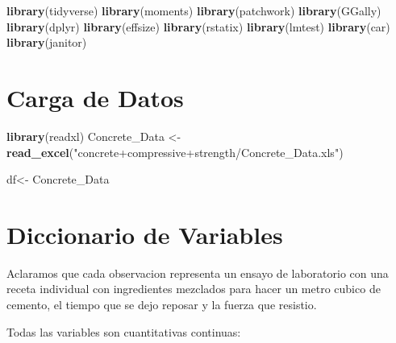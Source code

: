 \documentclass[
]{book}
\newenvironment{Shaded}{\begin{snugshade}}{\end{snugshade}}
\newcommand{\FunctionTok}[1]{\textcolor[rgb]{0.13,0.29,0.53}{\textbf{#1}}}
\newcommand{\NormalTok}[1]{#1}
\newcommand{\OtherTok}[1]{\textcolor[rgb]{0.56,0.35,0.01}{#1}}
\newcommand{\StringTok}[1]{\textcolor[rgb]{0.31,0.60,0.02}{#1}}
\begin{document}
\begin{Shaded}
\begin{Highlighting}[]
\FunctionTok{library}\NormalTok{(tidyverse) }
\FunctionTok{library}\NormalTok{(moments) }
\FunctionTok{library}\NormalTok{(patchwork) }
\FunctionTok{library}\NormalTok{(GGally) }
\FunctionTok{library}\NormalTok{(dplyr) }
\FunctionTok{library}\NormalTok{(effsize) }
\FunctionTok{library}\NormalTok{(rstatix)}
\FunctionTok{library}\NormalTok{(lmtest)   }
\FunctionTok{library}\NormalTok{(car)      }
\FunctionTok{library}\NormalTok{(janitor)  }
\end{Highlighting}
\end{Shaded}

\section{Carga de Datos}\label{carga-de-datos}

\begin{Shaded}
\begin{Highlighting}[]
\FunctionTok{library}\NormalTok{(readxl)}
\NormalTok{Concrete\_Data }\OtherTok{\textless{}{-}} \FunctionTok{read\_excel}\NormalTok{(}\StringTok{"concrete+compressive+strength/Concrete\_Data.xls"}\NormalTok{)}

\NormalTok{df}\OtherTok{\textless{}{-}}\NormalTok{ Concrete\_Data}
\end{Highlighting}
\end{Shaded}

\section{Diccionario de Variables}\label{diccionario-de-variables}

Aclaramos que cada observacion representa un ensayo de laboratorio con una receta individual con ingredientes mezclados para hacer un metro cubico de cemento, el tiempo que se dejo reposar y la fuerza que resistio.

Todas las variables son cuantitativas continuas:
\end{document}
